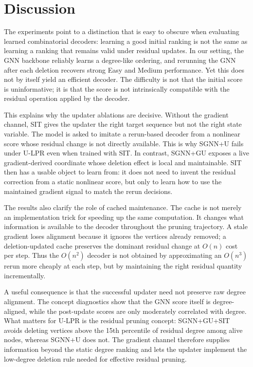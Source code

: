 \documentclass[11pt]{article}
\theoremstyle{plain}
\theoremstyle{remark}
\theoremstyle{plain}
\begin{document}
\section{Discussion}
\label{sec:discussion}

The experiments point to a distinction that is easy to obscure when evaluating
learned combinatorial decoders: learning a good initial ranking is not the same
as learning a ranking that remains valid under residual updates. In our setting,
the GNN backbone reliably learns a degree-like ordering, and rerunning the GNN
after each deletion recovers strong Easy and Medium performance. Yet this does
not by itself yield an efficient decoder. The difficulty is not that the initial
score is uninformative; it is that the score is not intrinsically compatible with
the residual operation applied by the decoder.

This explains why the updater ablations are decisive. Without the gradient
channel, SIT gives the updater the right target sequence but not the right state
variable. The model is asked to imitate a rerun-based decoder from a nonlinear
score whose residual change is not directly available. This is why SGNN+U fails
under U-LPR even when trained with SIT. In contrast, SGNN+GU exposes a live
gradient-derived coordinate whose deletion effect is local and maintainable. SIT
then has a usable object to learn from: it does not need to invent the residual
correction from a static nonlinear score, but only to learn how to use the
maintained gradient signal to match the rerun decisions.

The results also clarify the role of cached maintenance. The cache is not merely
an implementation trick for speeding up the same computation. It changes what
information is available to the decoder throughout the pruning trajectory. A
stale gradient loses alignment because it ignores the vertices already removed;
a deletion-updated cache preserves the dominant residual change at $O(n)$ cost
per step. Thus the $O(n^2)$ decoder is not obtained by approximating an
$O(n^3)$ rerun more cheaply at each step, but by maintaining the right residual
quantity incrementally.

A useful consequence is that the successful updater need not preserve raw degree
alignment. The concept diagnostics show that the GNN score itself is degree-aligned,
while the post-update scores are only moderately correlated with degree. What
matters for U-LPR is the residual pruning concept: SGNN+GU+SIT avoids deleting
vertices above the 15th percentile of residual degree among alive nodes, whereas
SGNN+U does not. The gradient channel therefore supplies information beyond the
static degree ranking and lets the updater implement the low-degree deletion rule
needed for effective residual pruning.
\end{document}
